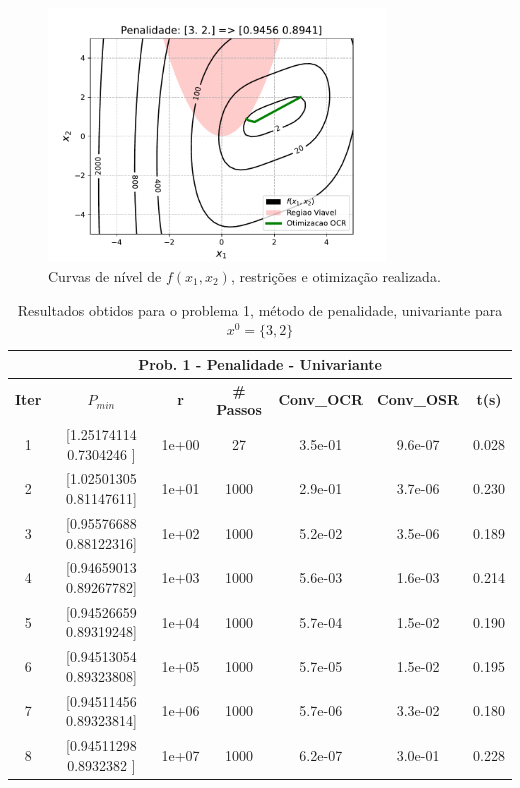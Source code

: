 \documentclass[10pt, a4paper]{article}
\begin{document}
\begin{figure}[H]
  \centering
    \includegraphics[width=0.8\textwidth]{fig_p1/Penalidade_f.pdf}
  \caption{Curvas de nível de $f(x_1,x_2)$, restrições e otimização realizada. }
\end{figure}


\vspace{5mm}
\begin{table}[H]
  \begin{center}
    \begin{tabular}{c|c|c|c|c|c|c}
      \multicolumn{7}{c}{\textbf{Prob. 1 - Penalidade - Univariante}}\\
      \hline
      \textbf{Iter} & \textbf{$P_{min}$} & \textbf{r} & \textbf{\# Passos} & \textbf{Conv\_OCR} & \textbf{Conv\_OSR} & \textbf{t(s)}\\
      \hline
        1& [1.25174114 0.7304246 ]& 1e+00& 27& 3.5e-01& 9.6e-07& 0.028   \\
        2& [1.02501305 0.81147611]& 1e+01& 1000& 2.9e-01& 3.7e-06& 0.230\\
        3& [0.95576688 0.88122316]& 1e+02& 1000& 5.2e-02& 3.5e-06& 0.189\\
        4& [0.94659013 0.89267782]& 1e+03& 1000& 5.6e-03& 1.6e-03& 0.214\\
        5& [0.94526659 0.89319248]& 1e+04& 1000& 5.7e-04& 1.5e-02& 0.190\\
        6& [0.94513054 0.89323808]& 1e+05& 1000& 5.7e-05& 1.5e-02& 0.195\\
        7& [0.94511456 0.89323814]& 1e+06& 1000& 5.7e-06& 3.3e-02& 0.180\\
        8& [0.94511298 0.8932382 ]& 1e+07& 1000& 6.2e-07& 3.0e-01& 0.228\\
    \end{tabular}
  \end{center}
  \caption{Resultados obtidos para o problema 1, método de penalidade, univariante para $x^0=\{3,2\}$}
\end{table}
\end{document}
